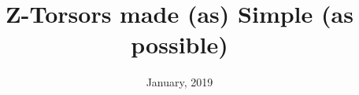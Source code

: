 \title{Z-Torsors made (as) Simple (as possible)}
\author{\myauthor}
\address{}
\email{}
\urladdr{}
\date{January, 2019}
\maketitle
{}%
